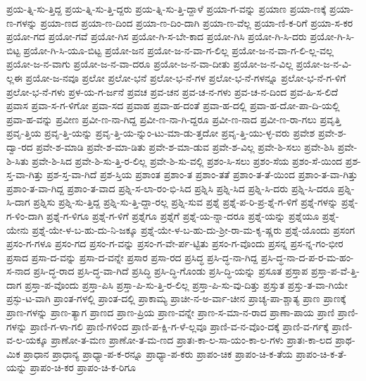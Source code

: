 {ಪ್ರಯ-ತ್ನಿ-ಸು-ತ್ತಿದ್ದ
ಪ್ರಯ-ತ್ನಿ-ಸು-ತ್ತಿ-ದ್ದರು
ಪ್ರಯ-ತ್ನಿ-ಸು-ತ್ತಿ-ದ್ದಾಳೆ
ಪ್ರಯಾ-ಗ-ವನ್ನು
ಪ್ರಯಾಣ
ಪ್ರಯಾ-ಣಕ್ಕೆ
ಪ್ರಯಾ-ಣ-ಗಳನ್ನು
ಪ್ರಯಾ-ಣದ
ಪ್ರಯಾ-ಣ-ದಿಂದ
ಪ್ರಯಾ-ಣ-ದಿಂ-ದಾಗಿ
ಪ್ರಯಾ-ಣ-ವೆಲ್ಲ
ಪ್ರಯಾ-ಣಿ-ಕ-ರಿಗೆ
ಪ್ರಯಾ-ಸ-ಕರ
ಪ್ರಯೋ-ಗದ
ಪ್ರಯೋ-ಗವೆ
ಪ್ರಯೋ-ಗಿಸ
ಪ್ರಯೋ-ಗಿ-ಸ-ಬೇ-ಕಾದ
ಪ್ರಯೋ-ಗಿಸಿ
ಪ್ರಯೋ-ಗಿ-ಸಿ-ದರು
ಪ್ರಯೋ-ಗಿ-ಸಿ-ಬಿಟ್ಟ
ಪ್ರಯೋ-ಗಿ-ಸಿ-ಯೂ-ಬಿಟ್ಟ
ಪ್ರಯೋ-ಜನ
ಪ್ರಯೋ-ಜ-ನ-ವಾ-ಗ-ಲಿಲ್ಲ
ಪ್ರಯೋ-ಜ-ನ-ವಾ-ಗ-ಲಿ-ಲ್ಲ-ವಲ್ಲ
ಪ್ರಯೋ-ಜ-ನ-ವಾಗು
ಪ್ರಯೋ-ಜ-ನ-ವಾ-ದರೂ
ಪ್ರಯೋ-ಜ-ನ-ವಾ-ದೀತು
ಪ್ರಯೋ-ಜ-ನ-ವಿಲ್ಲ
ಪ್ರಯೋ-ಜ-ನ-ವಿ-ಲ್ಲಈ
ಪ್ರಯೋ-ಜ-ನವೂ
ಪ್ರಲೋ
ಪ್ರಲೋ-ಭನೆ
ಪ್ರಲೋ-ಭ-ನೆ-ಗಳ
ಪ್ರಲೋ-ಭ-ನೆ-ಗಳನ್ನೂ
ಪ್ರಲೋ-ಭ-ನೆ-ಗ-ಳಿಗೆ
ಪ್ರಲೋ-ಭ-ನೆ-ಗಳು
ಪ್ರಳ-ಯ-ಗ-ರ್ಜನೆ
ಪ್ರವಚ
ಪ್ರವ-ಚನ
ಪ್ರವ-ಚ-ನ-ಗಳು
ಪ್ರವ-ಚ-ನ-ದಿಂದ
ಪ್ರವ-ಹಿ-ಸ-ಲಿದೆ
ಪ್ರವಾಸ
ಪ್ರವಾ-ಸ-ಗ-ಳಿಗೋ
ಪ್ರವಾ-ಸದ
ಪ್ರವಾಹ
ಪ್ರವಾ-ಹ-ದಂತೆ
ಪ್ರವಾ-ಹ-ದಲ್ಲಿ
ಪ್ರವಾ-ಹ-ದೋ-ಪಾ-ದಿ-ಯಲ್ಲಿ
ಪ್ರವಾ-ಹ-ವನ್ನು
ಪ್ರವೀಣ
ಪ್ರವೀ-ಣ-ನಾ-ಗಿದ್ದ
ಪ್ರವೀ-ಣ-ನಾ-ಗಿ-ದ್ದರೂ
ಪ್ರವೀ-ಣ-ನಾದ
ಪ್ರವೀ-ಣ-ರಾ-ಗಲು
ಪ್ರವೃತ್ತಿ
ಪ್ರವೃ-ತ್ತಿಯ
ಪ್ರವೃ-ತ್ತಿ-ಯನ್ನು
ಪ್ರವೃ-ತ್ತಿ-ಯ-ನ್ನುಂ-ಟು-ಮಾ-ಡು-ತ್ತದೋ
ಪ್ರವೃ-ತ್ತಿ-ಯು-ಳ್ಳ-ವರು
ಪ್ರವೇಶ
ಪ್ರವೇ-ಶ-ದ್ವಾ-ರದ
ಪ್ರವೇ-ಶ-ಮಾಡಿ
ಪ್ರವೇ-ಶ-ಮಾ-ಡಿತು
ಪ್ರವೇ-ಶ-ಮಾ-ಡುವ
ಪ್ರವೇ-ಶ-ವಿಲ್ಲ
ಪ್ರವೇ-ಶಿ-ಸಲು
ಪ್ರವೇ-ಶಿಸಿ
ಪ್ರವೇ-ಶಿ-ಸಿತು
ಪ್ರವೇ-ಶಿ-ಸಿದ
ಪ್ರವೇ-ಶಿ-ಸು-ತ್ತಿ-ರ-ಲಿಲ್ಲ
ಪ್ರವೇ-ಶಿ-ಸು-ವಲ್ಲಿ
ಪ್ರಶಂ-ಸಿ-ಸಲು
ಪ್ರಶಂ-ಸೆಯ
ಪ್ರಶಂ-ಸೆ-ಯಿಂದ
ಪ್ರಶ-ಸ್ತ-ವಾ-ಗಿತ್ತು
ಪ್ರಶ-ಸ್ತ-ವಾ-ಗಿದೆ
ಪ್ರಶ-ಸ್ತಿಯ
ಪ್ರಶಾಂತ
ಪ್ರಶಾಂ-ತ
ಪ್ರಶಾಂ-ತತೆ
ಪ್ರಶಾಂ-ತ-ತೆ-ಯಿಂದ
ಪ್ರಶಾಂ-ತ-ವಾ-ಗಿತ್ತು
ಪ್ರಶಾಂ-ತ-ವಾ-ಗಿದ್ದ
ಪ್ರಶಾಂ-ತ-ವಾದ
ಪ್ರಶ್ನಿ-ಸ-ಲಾ-ರಂ-ಭಿ-ಸಿದ
ಪ್ರಶ್ನಿಸಿ
ಪ್ರಶ್ನಿ-ಸಿದ
ಪ್ರಶ್ನಿ-ಸಿ-ದರು
ಪ್ರಶ್ನಿ-ಸಿ-ದರೂ
ಪ್ರಶ್ನಿ-ಸಿ-ದಾಗ
ಪ್ರಶ್ನಿಸು
ಪ್ರಶ್ನಿ-ಸು-ತ್ತಿದ್ದ
ಪ್ರಶ್ನಿ-ಸು-ತ್ತಿ-ದ್ದಾ-ರಲ್ಲ
ಪ್ರಶ್ನಿ-ಸುವ
ಪ್ರಶ್ನೆ
ಪ್ರಶ್ನೆ-ಪ-ರಿ-ಪ್ರ-ಶ್ನೆ-ಗ-ಳಿಗೆ
ಪ್ರಶ್ನೆ-ಗಳನ್ನು
ಪ್ರಶ್ನೆ-ಗ-ಳಿಂ-ದಾಗಿ
ಪ್ರಶ್ನೆ-ಗ-ಳಿಗೂ
ಪ್ರಶ್ನೆ-ಗ-ಳಿಗೆ
ಪ್ರಶ್ನೆಗೂ
ಪ್ರಶ್ನೆಗೆ
ಪ್ರಶ್ನೆ-ಯ-ನ್ನಾ-ದರೂ
ಪ್ರಶ್ನೆ-ಯನ್ನು
ಪ್ರಶ್ನೆಯೂ
ಪ್ರಶ್ನೆ-ಯೇನು
ಪ್ರಶ್ನೆ-ಯೇ-ಳ-ಬ-ಹು-ದು-ನಿ-ಜಕ್ಕೂ
ಪ್ರಶ್ನೆ-ಯೇ-ಳ-ಬ-ಹು-ದು-ಶ್ರೀ-ರಾ-ಮ-ಕೃ-ಷ್ಣರು
ಪ್ರಶ್ನೆ-ಯೊಂದು
ಪ್ರಸಂಗ
ಪ್ರಸಂ-ಗ-ಗಳೂ
ಪ್ರಸಂ-ಗದ
ಪ್ರಸಂ-ಗ-ವನ್ನು
ಪ್ರಸಂ-ಗ-ವೇ-ರ್ಪ-ಟ್ಟಿತು
ಪ್ರಸಂ-ಗ-ವೊಂದು
ಪ್ರಸನ್ನ
ಪ್ರಸ-ನ್ನ-ಗಂ-ಭೀರ
ಪ್ರಸಾದ
ಪ್ರಸಾ-ದ-ವನ್ನು
ಪ್ರಸಾ-ದ-ವನ್ನೇ
ಪ್ರಸಾರ
ಪ್ರಸಾ-ರದ
ಪ್ರಸಿದ್ಧ
ಪ್ರಸಿ-ದ್ಧ-ನಾ-ಗಿದ್ದ
ಪ್ರಸಿ-ದ್ಧ-ನಾ-ದ-ಪ-ರ-ಮ-ಹಂ-ಸ-ನಾದ
ಪ್ರಸಿ-ದ್ಧ-ರಾದ
ಪ್ರಸಿ-ದ್ಧ-ವಾ-ಗಿದೆ
ಪ್ರಸಿದ್ಧಿ
ಪ್ರಸಿ-ದ್ಧಿ-ಗೊಂಡು
ಪ್ರಸಿ-ದ್ಧಿ-ಯನ್ನು
ಪ್ರಸೂತ
ಪ್ರಸ್ತಾಪ
ಪ್ರಸ್ತಾ-ಪ-ವೆ-ತ್ತಿ-ದಾಗ
ಪ್ರಸ್ತಾ-ಪ-ವೊಂದು
ಪ್ರಸ್ತಾ-ಪಿಸಿ
ಪ್ರಸ್ತಾ-ಪಿ-ಸು-ತ್ತಿ-ರ-ಲಿಲ್ಲ
ಪ್ರಸ್ತಾ-ಪಿ-ಸು-ವು-ದಿತ್ತು
ಪ್ರಸ್ತುತ
ಪ್ರಸ್ತು-ತ-ವಾ-ಗಿಯೇ
ಪ್ರಸ್ಫು-ಟ-ವಾಗಿ
ಪ್ರಾಂತ-ಗಳಲ್ಲಿ
ಪ್ರಾಂತ-ದಲ್ಲಿ
ಪ್ರಾಕಾಮ್ಯ
ಪ್ರಾಚೀ-ನ-ಅ-ರ್ವಾ-ಚೀನ
ಪ್ರಾಚ್ಯ-ಪಾ-ಶ್ಚಾತ್ಯ
ಪ್ರಾಣ
ಪ್ರಾಣಕ್ಕೆ
ಪ್ರಾಣ-ಗಳನ್ನು
ಪ್ರಾಣ-ತ್ಯಾಗ
ಪ್ರಾಣದ
ಪ್ರಾಣ-ಪ್ರಿಯ
ಪ್ರಾಣ-ವನ್ನೇ
ಪ್ರಾಣ-ಸ-ಮಾ-ನ-ರಾದ
ಪ್ರಾಣಾ-ಪಾಯ
ಪ್ರಾಣಿ
ಪ್ರಾಣಿ-ಗಳನ್ನು
ಪ್ರಾಣಿ-ಗ-ಳಾ-ಗಲಿ
ಪ್ರಾಣಿ-ಗಳಿಂದ
ಪ್ರಾಣಿ-ಪ-ಕ್ಷಿ-ಗ-ಳೆ-ಲ್ಲವೂ
ಪ್ರಾಣಿ-ವ-ನ-ವೊಂ-ದಕ್ಕೆ
ಪ್ರಾಣಿ-ವ-ರ್ಗಕ್ಕೆ
ಪ್ರಾಣಿ-ವ-ಲ-ಯಕ್ಕೂ
ಪ್ರಾಣೋ-ತ-ಮಣ
ಪ್ರಾಣೋ-ತ-ಮ-ಣದ
ಪ್ರಾತಃ-ಕಾ-ಲ-ಸಾ-ಯಂ-ಕಾ-ಲ-ಗಳು
ಪ್ರಾತಃ-ಕಾ-ಲದ
ಪ್ರಾಥ-ಮಿಕ
ಪ್ರಾಧಾನ
ಪ್ರಾಧಾನ್ಯ
ಪ್ರಾಧ್ಯಾ-ಪ-ಕ-ರನ್ನೂ
ಪ್ರಾಧ್ಯಾ-ಪ-ಕರು
ಪ್ರಾಪಂ-ಚಿಕ
ಪ್ರಾಪಂ-ಚಿ-ಕ-ತೆಯ
ಪ್ರಾಪಂ-ಚಿ-ಕ-ತೆ-ಯನ್ನು
ಪ್ರಾಪಂ-ಚಿ-ಕರ
ಪ್ರಾಪಂ-ಚಿ-ಕ-ರಿಗೂ
}

